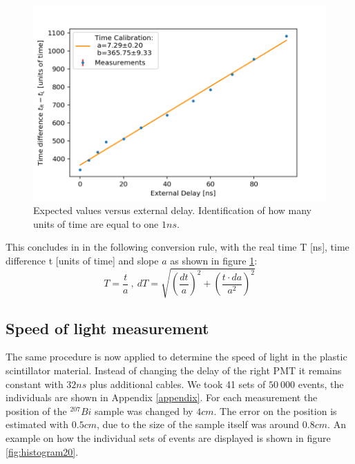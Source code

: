 \documentclass[]{article}
\begin{document}
\begin{figure}[H]
\centering
\includegraphics[width=1\textwidth]{Plots/TimeCalibration.png}
\caption{Expected values versus external delay. Identification of how many units of time are equal to one $1ns$. }
\label{fig:TimeCalibration}
\end{figure}

This concludes in in the following conversion rule, with the real time T [ns], time difference t [units of time] and slope $a$ as shown in figure \ref{fig:TimeCalibration}:
\begin{equation}
T = \frac{t}{a}\:,\: dT=\sqrt{\left(\frac{dt}{a}\right)^2 + \left(\frac{t\cdot da}{a^2}\right)^2}
\end{equation}


\subsection{Speed of light measurement}\label{c determination}
The same procedure is now applied to determine the speed of light in the plastic scintillator material. Instead of changing the delay of the right PMT it remains constant with $32ns$ plus additional cables. We took 41 sets of $50\ 000$ events, the individuals are shown in Appendix \ref{appendix}. For each measurement the position of the $^{207} Bi$ sample was changed by $4cm$. The error on the position is estimated with $0.5cm$, due to the size of the sample itself was around $0.8cm$. An example on how the individual sets of events are displayed is shown in figure \ref{fig:histogram20}.
\end{document}
